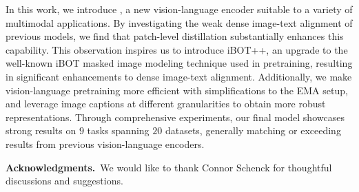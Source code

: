 In this work, we introduce \tipsvtwo, a new vision-language encoder suitable to a variety of multimodal applications.
By investigating the weak dense image-text alignment of previous models, we find that patch-level distillation substantially enhances this capability.
This observation inspires us to introduce iBOT++, an upgrade to the well-known iBOT masked image modeling technique used in pretraining, resulting in significant enhancements to dense image-text alignment.
Additionally, we make vision-language pretraining more efficient with simplifications to the EMA setup, and leverage image captions at different granularities to obtain more robust representations.
Through comprehensive experiments, our final \tipsvtwo model showcases strong results on $9$ tasks spanning $20$ datasets, generally matching or exceeding results from previous vision-language encoders.

\noindent\textbf{Acknowledgments.}~We would like to thank Connor Schenck for thoughtful discussions and suggestions.
